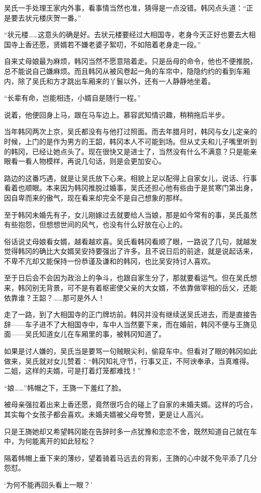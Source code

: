 吴氏一手处理王家内外事，看事情当然也准，猜得是一点没错。韩冈点头道：“正是要去状元楼庆贺一番。”

“状元楼……这意头的确是好。去状元楼要经过大相国寺，老身今天正好也要去大相国寺上香还愿，贤婿若不嫌老婆子絮叨，不如陪着老身走一段。”

自来丈母娘最为麻烦，韩冈当然不愿意陪着走。只是岳母的命令，他也不便推脱，总不能说自己嫌麻烦。而且韩冈从被风卷起一角的车帘中，隐隐约约的看到车厢内，除了吴氏和方才跳出车厢来的丫鬟以外，还有一人静静地坐着。

“长辈有命，岂能相违，小婿自是随行一程。”

说着，他便回身上马，跟在马车边上。慕容武知情识趣，稍稍拖后半步。

当年韩冈两次上京，吴氏都没有与他打过照面。而去年腊月时，韩冈与女儿定亲的时候，上门的是作为男方的王韶，韩冈本人不可能到场。但从丈夫和儿子嘴里听到的韩冈，已经让她点头了。现在很快又是进士了，当然没有什么不满意？只是能亲眼看一看人物模样，再说几句话，则是会更加安心。

路边的这番巧遇，就是让吴氏放下心来。相貌上足以配得上自家女儿，说话、行事看着也顺眼。本来因为韩冈推脱过婚事，吴氏还担心他有些由于是贫寒门第出身，因自卑而来的傲气，现在看来却完全不是自己想象的那样。

至于韩冈未婚先有子，女儿刚嫁过去就要给人当娘，那是如今常有的事，吴氏虽然有些抱怨，但想想世间的风气，也没有什么好放在心上的。

俗话说丈母娘看女婿，越看越欢喜。吴氏看韩冈看顺了眼，一路说了几句，就越发觉得韩冈的确比大女婿吴安持要强出了许多。且不说日后的前途，就是说起话来，不卑不亢却又能保持一份恭谨及谦和的韩冈，也比吴安持讨人喜欢。

至于日后会不会因为政治上的争斗，也跟自家生分了，那就要看运气。但在吴氏想来，韩冈别无背景，可不是有着枢密使父亲的大女婿，不依靠做宰相的岳父，还能依靠谁？王韶？……那可是外人！

走了一路，到了大相国寺的正门牌坊前。韩冈并没有继续送吴氏进去，而是直接告辞——车子进不了大相国寺中，车中人当然要下来，而在婚前，韩冈不便与王旖见面——吴氏知道女儿在车厢里的事，被韩冈知道了。

如果是讨人嫌的，吴氏当是要骂一句贼眼尖利，偷窥车中。但看对了眼的韩冈如此做来，吴氏就对女儿赞着：“韩冈知礼守节，行事又正，不阿谀奉承，当真难得。二姐，这样的夫婿，可是打着灯笼都难找！”

“娘……”帏帽之下，王旖一下羞红了脸。

被母亲强拉着出来上香还愿，竟然很巧合的碰上了自家的未婚夫婿。这样的巧合，其实每个女孩子都会喜欢。未婚夫婿被父母夸赞，更是让人高兴。

只是王旖她却又希望韩冈能在告辞时多一点犹豫和恋恋不舍，既然知道自己就在车中，为何能离开的如此轻松？

隔着帏帽上垂下来的薄纱，望着骑着马远去的背影，王旖的心中就不免平添了几分怨怼。

‘为何不能再回头看上一眼？’

